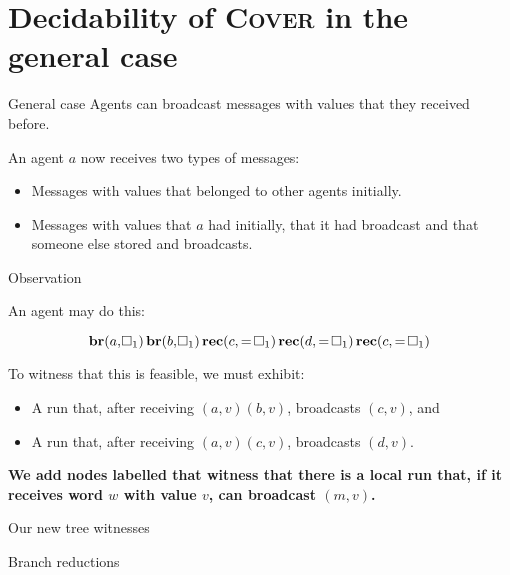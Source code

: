 \documentclass{beamer}
\newcommand{\br}{\mathbf{br}}
\newcommand{\rec}{\mathbf{rec}}
\newcommand{\reg}{\hspace{-0.5mm}\square}
\newcommand{\COVER}{\textsc{Cover}}
\begin{document}
\section{Decidability of \COVER{} in the general case}


\begin{frame}{General case}
	Agents can broadcast messages with values that they received before.
	\vspace{0.5cm}
	
	An agent $a$ now receives two types of messages:
	\begin{itemize}
		\item Messages with values that belonged to other agents initially.
		
		\item Messages with values that $a$ had initially, that it had broadcast and that someone else stored and broadcasts.  
	\end{itemize}
\end{frame}

\begin{frame}{Observation}
	
	An agent may do this:
	
	\[ \br(a, \reg_1) \, \br(b, \reg_1) \, \rec(c, =\reg_1)  \,\rec(d, =\reg_1) \, \rec(c, =\reg_1)\]
	\pause
	
	To witness that this is feasible, we must exhibit: 
	\begin{itemize}
		\item A run that, after receiving $(a, v) (b, v)$, broadcasts $(c,v)$, and
		
		\item A run that, after receiving $(a,v) (c,v)$, broadcasts $(d,v)$.
	\end{itemize}
\vspace{0.5cm}

	\pause
	\textbf{We add nodes labelled  that witness that there is a local run that, if it receives word $w$ with value $v$, can broadcast $(m,v)$.}
\end{frame}

\begin{frame}{Our new tree witnesses}
	
	
	
\end{frame}


\begin{frame}{Branch reductions}
	\begin{columns}
		\begin{column}{0.5\textwidth}
			
		\end{column}
		
		\begin{column}{0.5\textwidth}
			
		\end{column}
	\end{columns}
	
\end{frame}
\end{document}
